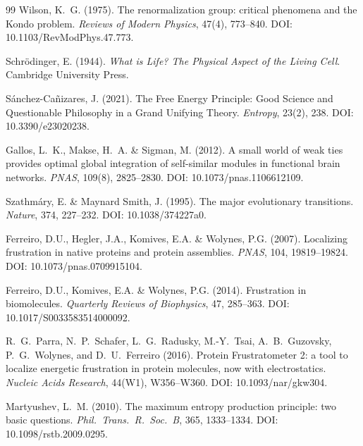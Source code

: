 \documentclass[12pt,a4paper]{article}
\theoremstyle{remark}
\begin{document}
\begin{thebibliography}{99}
Wilson, K.~G. (1975).
\newblock The renormalization group: critical phenomena and the Kondo problem.
\newblock \textit{Reviews of Modern Physics}, 47(4), 773--840.
\newblock DOI: 10.1103/RevModPhys.47.773.

Schrödinger, E. (1944).
\newblock \textit{What is Life? The Physical Aspect of the Living Cell}.
\newblock Cambridge University Press.

S\'anchez-Ca\~nizares, J. (2021).
\newblock The Free Energy Principle: Good Science and Questionable Philosophy in a Grand Unifying Theory.
\newblock \textit{Entropy}, 23(2), 238.
\newblock DOI: 10.3390/e23020238.

Gallos, L.~K., Makse, H.~A. \& Sigman, M. (2012).
\newblock A small world of weak ties provides optimal global integration of self-similar modules in functional brain networks.
\newblock \textit{PNAS}, 109(8), 2825--2830.
\newblock DOI: 10.1073/pnas.1106612109.

Szathm\'ary, E. \& Maynard Smith, J. (1995).
\newblock The major evolutionary transitions.
\newblock \textit{Nature}, 374, 227--232.
\newblock DOI: 10.1038/374227a0.

Ferreiro, D.U., Hegler, J.A., Komives, E.A. \& Wolynes, P.G. (2007).
\newblock Localizing frustration in native proteins and protein assemblies.
\newblock \textit{PNAS}, 104, 19819--19824.
\newblock DOI: 10.1073/pnas.0709915104.

Ferreiro, D.U., Komives, E.A. \& Wolynes, P.G. (2014).
\newblock Frustration in biomolecules.
\newblock \textit{Quarterly Reviews of Biophysics}, 47, 285--363.
\newblock DOI: 10.1017/S0033583514000092.

R.~G.~Parra, N.~P.~Schafer, L.~G.~Radusky, M.-Y.~Tsai, A.~B.~Guzovsky, P.~G.~Wolynes, and D.~U.~Ferreiro (2016).
\newblock Protein Frustratometer 2: a tool to localize energetic frustration in protein molecules, now with electrostatics.
\newblock \textit{Nucleic Acids Research}, 44(W1), W356--W360.
\newblock DOI: 10.1093/nar/gkw304.

Martyushev, L.~M. (2010).
\newblock The maximum entropy production principle: two basic questions.
\newblock \textit{Phil.\ Trans.\ R.\ Soc.\ B}, 365, 1333--1334.
\newblock DOI: 10.1098/rstb.2009.0295.


\end{thebibliography}
\end{document}

